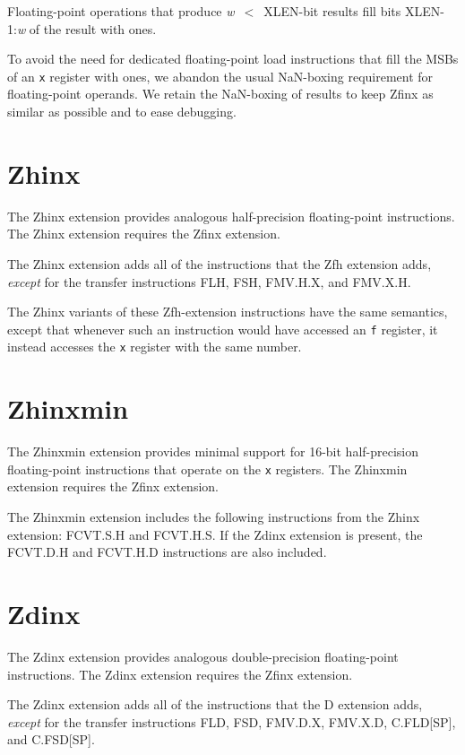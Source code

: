 Floating-point operations that produce \mbox{{\em w} $<$ XLEN-bit} results
fill bits \mbox{XLEN-1:{\em w}} of the result with ones.

\begin{commentary}
To avoid the need for dedicated floating-point load instructions that fill the
MSBs of an {\tt x} register with ones, we abandon the usual NaN-boxing
requirement for floating-point operands.
We retain the NaN-boxing of results to keep Zfinx as similar as possible and
to ease debugging.
\end{commentary}

\section{Zhinx}

The Zhinx extension provides analogous half-precision floating-point
instructions.
The Zhinx extension requires the Zfinx extension.

The Zhinx extension adds all of the instructions that the Zfh extension
adds, {\em except} for the transfer instructions FLH, FSH, FMV.H.X,
and FMV.X.H.

The Zhinx variants of these Zfh-extension instructions have the same semantics,
except that whenever such an instruction would have accessed an {\tt f}
register, it instead accesses the {\tt x} register with the same number.

\section{Zhinxmin}

The Zhinxmin extension provides minimal support for 16-bit half-precision
floating-point instructions that operate on the {\tt x} registers.
The Zhinxmin extension requires the Zfinx extension.

The Zhinxmin extension includes the following instructions from the Zhinx
extension: FCVT.S.H and FCVT.H.S.
If the Zdinx extension is present, the FCVT.D.H and FCVT.H.D instructions are
also included.

\section{Zdinx}

The Zdinx extension provides analogous double-precision floating-point
instructions.
The Zdinx extension requires the Zfinx extension.

The Zdinx extension adds all of the instructions that the D extension
adds, {\em except} for the transfer instructions FLD, FSD, FMV.D.X,
FMV.X.D, C.FLD[SP], and C.FSD[SP].

